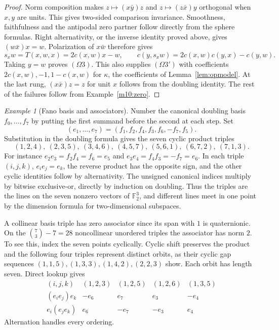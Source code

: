 \documentclass[11pt,reqno]{amsart}
\theoremstyle{definition}
\theoremstyle{remark}
\newtheorem{example}[theorem]{Example}
\numberwithin{equation}{section}
\begin{document}
\begin{proof}
Norm composition makes \(z\mapsto (x\bar y)z\) and
\(z\mapsto(z\bar x)y\) orthogonal when \(x,y\) are units. This gives
two-sided comparison invariance. Smoothness, faithfulness and the
antipodal zero partner follow directly from the sphere formulas.
Right alternativity, or the inverse identity proved above, gives
\((w\bar x)x=w\). Polarization of \(x\bar w\) therefore gives
\[
 s_xw=T(x,w,x)=2c(x,w)x-w,\qquad
 c(y,s_xw)=2c(x,w)c(y,x)-c(y,w).
\]
Taking \(y=w\) proves \((\Omega3)\). This also supplies
\((\Omega3')\) with coefficients \(2c(x,w),-1,1-c(x,w)\) for \(\kappa\),
the coefficients of Lemma~\ref{lem:opmodel}.
At the last rung, \((x\bar x)z=z\) for unit \(x\) follows from the
doubling identity. The rest of the failures follow from
Example~\ref{m10:zero}.
\end{proof}

\begin{example}[Fano basis and associators]\label{m10:fano}
Number the canonical doubling basis \(f_0,\ldots,f_7\) by putting the
first summand before the second at each step. Set
\[
 (e_1,\ldots,e_7)=(f_1,f_2,f_4,f_3,f_6,-f_7,f_5).
\]
Substitution in the doubling formula gives the seven cyclic product
triples
\[
 (1,2,4),\ (2,3,5),\ (3,4,6),\ (4,5,7),\
 (5,6,1),\ (6,7,2),\ (7,1,3).
\]
For instance \(e_2e_3=f_2f_4=f_6=e_5\) and
\(e_3e_4=f_4f_3=-f_7=e_6\). In each triple \((i,j,k)\),
\(e_i e_j=e_k\), the reverse product has the opposite sign, and the
other cyclic identities follow by alternativity. The unsigned
canonical indices multiply by bitwise exclusive-or, directly by
induction on doubling. Thus the triples are the lines on the seven
nonzero vectors of \(\mathbb F_2^3\), and different lines meet in one
point by the dimension formula for two-dimensional subspaces.

A collinear basis triple has zero associator since its span with
\(1\) is quaternionic. On the \(\binom73-7=28\) noncollinear unordered
triples the associator has norm \(2\). To see this, index the seven
points cyclically. Cyclic shift preserves the product and the
following four triples represent distinct orbits, as their cyclic
gap sequences \((1,1,5),(1,3,3),(1,4,2),(2,2,3)\) show.
Each orbit has length seven. Direct lookup gives
\[
\begin{array}{c|rrrr}
(i,j,k)&(1,2,3)&(1,2,5)&(1,2,6)&(1,3,5)\\ \hline
(e_i e_j)e_k&-e_6&e_7&e_3&-e_4\\
e_i(e_j e_k)&e_6&-e_7&-e_3&e_4
\end{array}
\]
Alternation handles every ordering.
\end{example}
\end{document}
